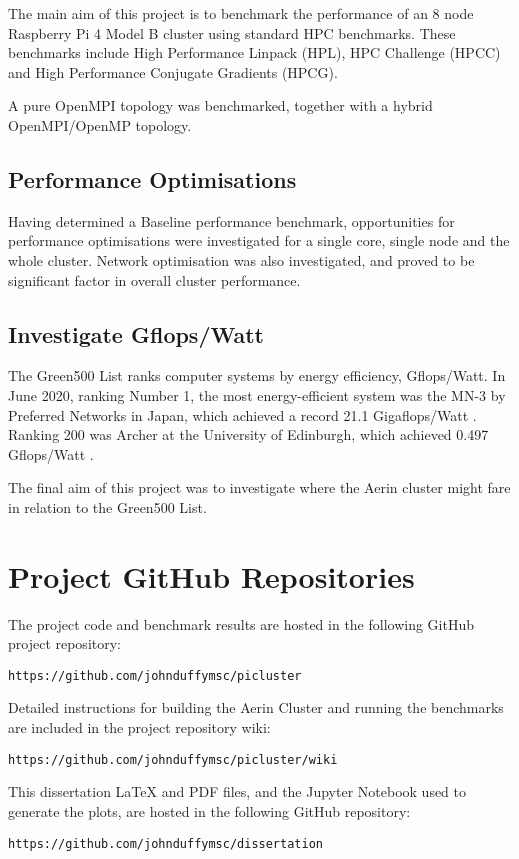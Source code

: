 The main aim of this project is to benchmark the performance of an 8 node Raspberry Pi 4 Model B cluster using standard HPC benchmarks. These benchmarks include High Performance Linpack (HPL), HPC Challenge (HPCC) and High Performance Conjugate Gradients (HPCG).

A pure OpenMPI topology was benchmarked, together with a hybrid OpenMPI/OpenMP topology.


%
%
\subsection{Performance Optimisations}

Having determined a Baseline performance benchmark, opportunities for performance optimisations were investigated for a single core, single node and the whole cluster. Network optimisation was also investigated, and proved to be significant factor in overall cluster performance. 


%
%
\subsection{Investigate Gflops/Watt}

The Green500 List ranks computer systems by energy efficiency, Gflops/Watt. In June 2020, ranking Number 1, the most energy-efficient system was the MN-3 by Preferred Networks in Japan, which achieved a record 21.1 Gigaflops/Watt \cite{green500}. Ranking 200 was Archer at the University of Edinburgh, which achieved 0.497 Gflops/Watt \cite{green500}.

The final aim of this project was to investigate where the Aerin cluster might fare in relation to the Green500 List. 


%
%
\section{Project GitHub Repositories}

The project code and benchmark results are hosted in the following GitHub project repository:

\begin{verbatim}
https://github.com/johnduffymsc/picluster
\end{verbatim}

Detailed instructions for building the Aerin Cluster and running the benchmarks are included in the project repository wiki:

\begin{verbatim}
https://github.com/johnduffymsc/picluster/wiki
\end{verbatim}

This dissertation \LaTeX{} and PDF files, and the Jupyter Notebook used to generate the plots, are hosted in the following GitHub repository:

\begin{verbatim}
https://github.com/johnduffymsc/dissertation
\end{verbatim}
 


